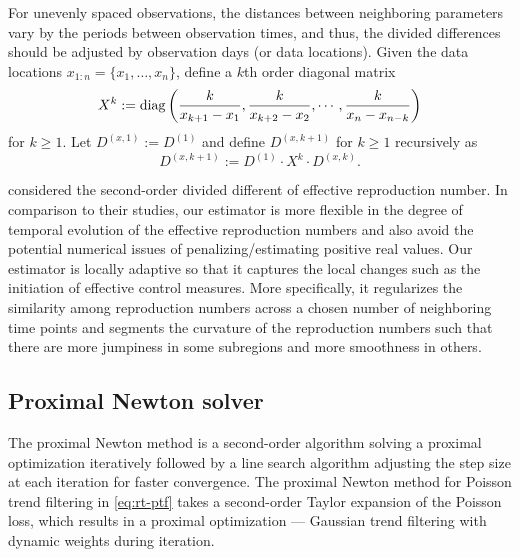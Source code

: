 For unevenly spaced observations, the distances between neighboring parameters vary by the periods between observation times, and thus, the divided differences should be adjusted by observation days (or data locations). Given the data locations $x_{1:n} = \{x_1,\dots,x_n\}$, define a $k$th order diagonal matrix $$X^k := \operatorname*{diag} \left(\frac{k}{x_{k+1} - x_1}, \frac{k}{x_{k+2} - x_2}, \cdots, \frac{k}{x_n - x_{n-k}} \right)$$ for $k \geq 1$. Let $D^{(x,1)} := D^{(1)}$ and define $D^{(x,k+1)}$ for $k\geq 1$ recursively as $$D^{(x,k+1)} := D^{(1)}\cdot X^k \cdot D^{(x,k)}.$$ 

\cite{abry2020spatial,pascal2022nonsmooth} considered the second-order divided different of effective reproduction number. In comparison to their studies, our estimator is more flexible in the degree of temporal evolution of the effective reproduction numbers and also avoid the potential numerical issues of penalizing/estimating positive real values. 
Our estimator is locally adaptive so that it captures the local changes such as the initiation of effective control measures. More specifically, it regularizes the similarity among reproduction numbers across a chosen number of neighboring time points and segments the curvature of the reproduction numbers such that there are more jumpiness in some subregions and more smoothness in others. 

\subsection{Proximal Newton solver} %

The proximal Newton method is a second-order algorithm solving a proximal optimization iteratively followed by a line search algorithm adjusting the step size at each iteration for faster convergence. The proximal Newton method for Poisson trend filtering in \eqref{eq:rt-ptf} takes a second-order Taylor expansion of the Poisson loss, which results in a proximal optimization --- Gaussian trend filtering with dynamic weights during iteration. 

